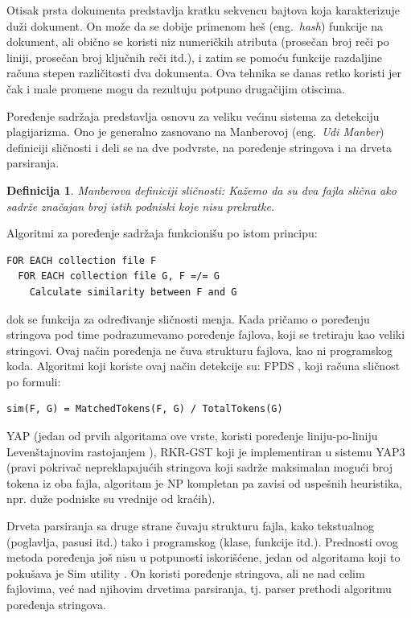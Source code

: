 \documentclass[a4paper]{article}
\newtheorem{definicija}{Definicija}[section]
\begin{document}
\par Otisak prsta dokumenta predstavlja kratku sekvencu bajtova koja karakterizuje duži dokument. On može da se dobije primenom heš (eng.~{\em hash}) funkcije na dokument, ali obično se koristi niz numeričkih atributa (prosečan broj reči po liniji, prosečan broj ključnih reči itd.), i zatim se pomoću funkcije razdaljine računa stepen različitosti dva dokumenta. Ova tehnika se danas retko koristi jer čak i male promene mogu da rezultuju potpuno drugačijim otiscima.
\par Poređenje sadržaja predstavlja osnovu za veliku većinu sistema za detekciju plagijarizma. Ono je generalno zasnovano na Manberovoj (eng.~{\em Udi Manber}) definiciji sličnosti \cite{manber} i deli se na dve podvrste, na poređenje stringova i na drveta parsiranja.
\begin{definicija}
Manberova definiciji sličnosti: Kažemo da su dva fajla slična ako sadrže značajan broj istih podniski koje nisu prekratke.
\end{definicija}
Algoritmi za poređenje sadržaja funkcionišu po istom principu:
\begin{lstlisting}
FOR EACH collection file F
  FOR EACH collection file G, F =/= G
    Calculate similarity between F and G
\end{lstlisting}
dok se funkcija za određivanje sličnosti menja. Kada pričamo o poređenju stringova pod time podrazumevamo poređenje fajlova, koji se tretiraju kao veliki stringovi. Ovaj način poređenja ne čuva strukturu fajlova, kao ni programskog koda. Algoritmi koji koriste ovaj način detekcije su: FPDS \cite{mozgovoyetal}, koji računa sličnost po formuli:
\begin{lstlisting}
sim(F, G) = MatchedTokens(F, G) / TotalTokens(G)
\end{lstlisting}
YAP \cite{wise} (jedan od prvih algoritama ove vrste, koristi poređenje liniju-po-liniju Levenštajnovim rastojanjem \cite{levenshtein}), RKR-GST koji je implementiran u sistemu YAP3 \cite{wise2} (pravi pokrivač nepreklapajućih stringova koji sadrže maksimalan mogući broj tokena iz oba fajla, algoritam je NP kompletan pa zavisi od uspešnih heuristika, npr. duže podniske su vrednije od kraćih).
\par Drveta parsiranja sa druge strane čuvaju strukturu fajla, kako tekstualnog (poglavlja, pasusi itd.) tako i programskog (klase, funkcije itd.). Prednosti ovog metoda poređenja još nisu u potpunosti iskorišćene, jedan od algoritama koji to pokušava je Sim utility \cite{gitchelltran}. On koristi poređenje stringova, ali ne nad celim fajlovima, već nad njihovim drvetima parsiranja, tj. parser prethodi algoritmu poređenja stringova.
\end{document}
